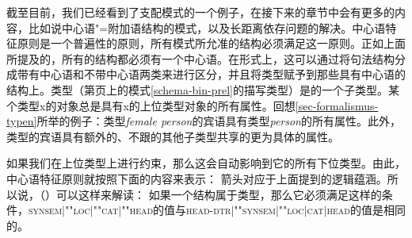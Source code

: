 截至目前，我们已经看到了支配模式的一个例子，在接下来的章节中会有更多的内容，比如说中心语"=附加语结构的模式，以及长距离依存问题的解决。中心语特征原则是一个普遍性的原则，所有模式所允准的结构必须满足这一原则。正如上面所提及的，所有的结构都必须有一个中心语。在形式上，这可以通过将句法结构分成带有中心语和不带中心语两类来进行区分，并且将类型赋予到那些具有中心语的结构上。类型（第\pageref{schema-bin-prel}页上的模式\ref{schema-bin-prel}的描写类型）是的一个子类型。某个类型x的对象总是具有x的上位类型对象的所有属性。回想\ref{sec-formalismus-typen}所举的例子：类型\textit{female person}的宾语具有类型\textit{person}的所有属性。此外，类型的宾语具有额外的、不跟的其他子类型共享的更为具体的属性。

如果我们在上位类型上进行约束，那么这会自动影响到它的所有下位类型。由此，中心语特征原则就按照下面的内容来表示：
\ea
{} \impl
{} 
\z
箭头\isc{\impl}\is{\impl}对应于上面提到的逻辑蕴涵。所以说，（）可以这样来解读：
如果一个结构属于类型，那么它必须满足这样的条件，\textsc{synsem$|$""loc$|$""cat$|$""head}的值与\textsc{head-dtr$|$""synsem$|$""loc$|$cat$|$head}的值是相同的。

